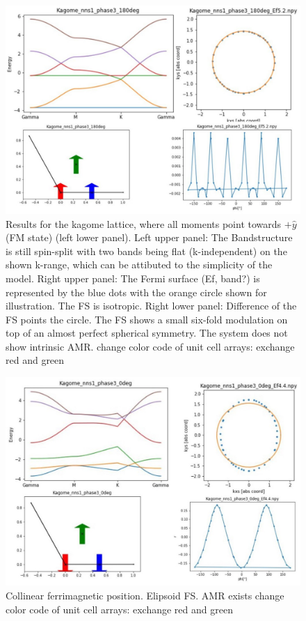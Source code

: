 \documentclass[prb,showpacs,amsmath,amssymb,superscriptaddress,twocolumn,floatfix]{revtex4-1}
\begin{document}
\begin{appendix}
\begin{figure}
	\centering
	\includegraphics[width=0.9\linewidth]{img_total/total_Kagome_phase3_180}
	\caption{Results for the kagome lattice, where all moments point towards $+\hat{y}$ (FM state) (left lower panel). Left upper panel: The Bandstructure is still spin-split with two bands being flat (k-independent) on the shown k-range, which can be attibuted to the simplicity of the model. Right upper panel: The Fermi surface {\color{red} (Ef, band?)} is represented by the blue dots with the orange circle shown for illustration. The FS is isotropic. Right lower panel: Difference of the FS points the circle. The FS shows a small six-fold modulation on top of an almost perfect spherical symmetry. The system does not show intrinsic AMR. {\color{red} change color code of unit cell arrays: exchange red and green}}
	\label{fig:totalkagomephase3180}
\end{figure}

\begin{figure}
	\centering
	\includegraphics[width=0.9\linewidth]{img_total/total_Kagome_phase3_0}
	\caption{Collinear ferrimagnetic position. Elipsoid FS. AMR exists{\color{red} change color code of unit cell arrays: exchange red and green}}
	\label{fig:totalkagomephase30}
\end{figure}


\end{appendix}
\end{document}
